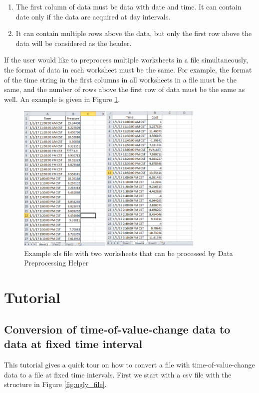 \documentclass[12pt,a4paper]{article}
\begin{document}
\begin{enumerate}
\item The first column of data must be data with date and time. It can contain date only if the data are acquired at day intervals.
\item It can contain multiple rows above the data, but only the first row above the data will be considered as the header.
\end{enumerate}

If the user would like to preprocess multiple worksheets in a file simultaneously, the format of data in each worksheet must be the same.
For example, the format of the time string in the first columns in all worksheets in a file must be the same, and the number of rows above the first row of data must be the same as well.
An example is given in Figure \ref{fig:xls_file}.

\begin{figure}[H]
\centering
\includegraphics[width=0.8\textwidth]{xls-file.png}
\caption{Example xls file with two worksheets that can be processed by Data Preprocessing Helper}
\label{fig:xls_file}
\end{figure}

\section{Tutorial}

\subsection{Conversion of time-of-value-change data to data at fixed time interval}

This tutorial gives a quick tour on how to convert a file with time-of-value-change data to a file at fixed time intervals.
First we start with a csv file with the structure in Figure \ref{fig:ugly_file}.
\end{document}
